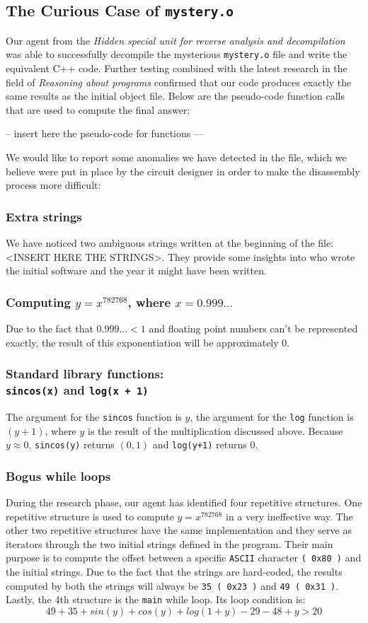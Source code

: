 \subsection{The Curious Case of \texttt{mystery.o}}

Our agent from the \emph{Hidden special unit for reverse analysis and decompilation} was able to successfully decompile the mysterious \texttt{mystery.o} file and write the equivalent C++ code. Further testing combined with the latest research in the field of \emph{Reasoning about programs} confirmed that our code produces exactly the same results as the initial object file. Below are the pseudo-code function calls that are used to compute the final answer:

-- insert here the pseudo-code for functions ---

We would like to report some anomalies we have detected in the file, which we believe were put in place by the circuit designer in order to make the disassembly process more difficult:
\subsubsection{Extra strings}
We have noticed two ambiguous strings written at the beginning of the file: <INSERT HERE THE STRINGS>. They provide some insights into who wrote the initial software and the year it might have been written.
\subsubsection{Computing $y = x^{782768}$, where $x = 0.999 \ldots$}
Due to the fact that $0.999 \ldots < 1$ and floating point numbers can't be represented exactly, the result of this exponentiation will be approximately $0$.
\subsubsection{Standard library functions: \\ \texttt{sincos(x)} and \texttt{log(x + 1)}}
The argument for the \texttt{sincos} function is $y$, the argument for the \texttt{log} function is $(y + 1)$, where $y$ is the result of the multiplication discussed above. Because $y \approx 0$, \texttt{sincos(y)} returns $(0,1)$ and \texttt{log(y+1)} returns $0$.
\subsubsection{Bogus while loops}
During the research phase, our agent has identified four repetitive structures. One repetitive structure is used to compute $y = x^{782768}$ in a very ineffective way. The other two repetitive structures have the same implementation and they serve as iterators through the two initial strings defined in the program. Their main purpose is to compute the offset between a specific \texttt{ASCII} character \texttt{( 0x80 )} and the initial strings. Due to the fact that the strings are hard-coded, the results computed by both the strings will always be \texttt{35 ( 0x23 )} and \texttt{49 ( 0x31 )}.
Lastly, the 4th structure is the \texttt{main} while loop. Its loop condition is:
$$49 + 35 + sin(y) + cos(y) + log(1+y) - 29 - 48 + y > 20$$

